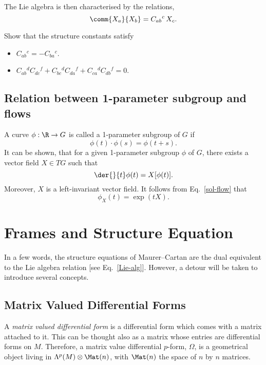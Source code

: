 The Lie algebra is then characterised by the relations,
\begin{equation}
  \comm{X_a}{X_b} = C_{ab}{}^c\, X_c .
  \label{Lie-alg}
\end{equation}

\begin{Ebox}
  Show that the structure constants satisfy 
  \begin{itemize}
  \item $C_{ab}{}^c = - C_{ba}{}^c$.
  \item $C_{ab}{}^d C_{dc}{}^f + C_{bc}{}^d C_{da}{}^f + C_{ca}{}^d C_{db}{}^f = 0$.
  \end{itemize}
\end{Ebox}


\subsection{Relation between 1-parameter subgroup and flows}

A curve $\phi: \R \to G$ is called a 1-parameter subgroup of $G$ if
\begin{equation*}
  \phi(t) \cdot \phi(s) = \phi(t+s).
\end{equation*}
It can be shown, that for a given 1-parameter subgroup $\phi$ of $G$, there exists a vector field $X \in TG$ such that 
\begin{equation*}
  \der{}{t} \phi(t) = X[\phi(t)].
\end{equation*}
Moreover, $X$ is a left-invariant vector field. It follows from Eq.~\eqref{sol-flow} that
\begin{equation}
  \phi_X(t) = \exp(t X).
\end{equation}

\section{Frames and Structure Equation}

In a few words, the structure equations of Maurer--Cartan are the dual equivalent to the Lie algebra relation [see Eq.~\eqref{Lie-alg}]. However, a detour will be taken to introduce several concepts.

\subsection{Matrix Valued Differential Forms}

A \emph{matrix valued differential form} is a  differential form which comes with a matrix attached to it. This can be thought also as a matrix whose entries are differential forms on $M$. Therefore, a matrix value differential $p$-form, $\Omega$, is a geometrical object living in \mbox{$\Lambda^p(M) \otimes \Mat(n)$,} with $\Mat(n)$ the space of $n$ by $n$ matrices.

